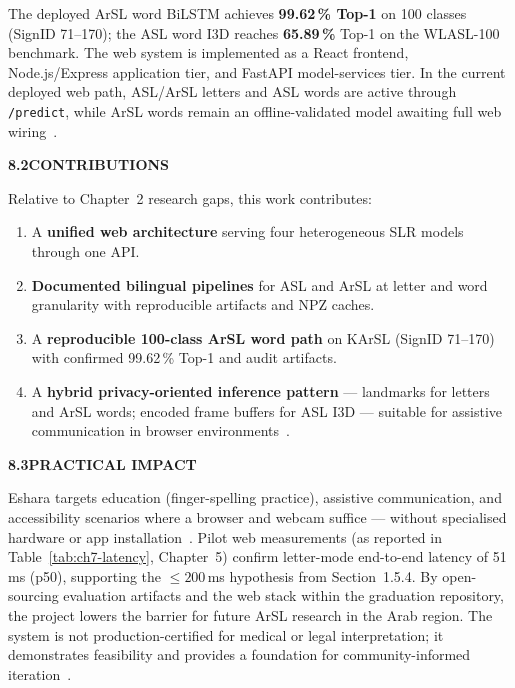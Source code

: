 \noindent The deployed ArSL word BiLSTM achieves \textbf{99.62\,\% Top-1} on 100 classes (SignID 71--170); the ASL word I3D reaches \textbf{65.89\,\%} Top-1 on the WLASL-100 benchmark. The web system is implemented as a React frontend, Node.js/Express application tier, and FastAPI model-services tier. In the current deployed web path, ASL/ArSL letters and ASL words are active through \texttt{/predict}, while ArSL words remain an offline-validated model awaiting full web wiring~\cite{fastapi,react,mediapipeweb}.\par\vspace{0.3cm}
\clearpage
\noindent\textbf{8.2\quad CONTRIBUTIONS}\par
{}
\vspace{0.2cm}

\noindent Relative to Chapter~2 research gaps, this work contributes:
\begin{enumerate}
\item A \textbf{unified web architecture} serving four heterogeneous SLR models through one API.
\item \textbf{Documented bilingual pipelines} for ASL and ArSL at letter and word granularity with reproducible artifacts and NPZ caches.
\item A \textbf{reproducible 100-class ArSL word path} on KArSL (SignID 71--170) with confirmed 99.62\,\% Top-1 and audit artifacts.
\item A \textbf{hybrid privacy-oriented inference pattern} --- landmarks for letters and ArSL words; encoded frame buffers for ASL I3D --- suitable for assistive communication in browser environments~\cite{rfc6455,zhang2020mediapipe}.
\end{enumerate}
\vspace{0.3cm}

\noindent\textbf{8.3\quad PRACTICAL IMPACT}\par
{}
\vspace{0.2cm}

\noindent Eshara targets education (finger-spelling practice), assistive communication, and accessibility scenarios where a browser and webcam suffice --- without specialised hardware or app installation~\cite{who2024hearing,wcag22}. Pilot web measurements (as reported in Table~\ref{tab:ch7-latency}, Chapter~5) confirm letter-mode end-to-end latency of 51\,ms (p50), supporting the $\leq 200$\,ms hypothesis from Section~1.5.4. By open-sourcing evaluation artifacts and the web stack within the graduation repository, the project lowers the barrier for future ArSL research in the Arab region. The system is not production-certified for medical or legal interpretation; it demonstrates feasibility and provides a foundation for community-informed iteration~\cite{noor2024hybrid}.\par
